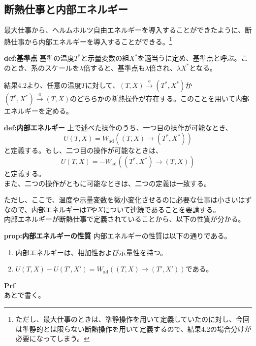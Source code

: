\documentclass[a4paper,11pt]{jsarticle}
\begin{document}
\subsection{断熱仕事と内部エネルギー}
最大仕事から、ヘルムホルツ自由エネルギーを導入することができたように、断熱仕事から内部エネルギーを導入することができる。\footnote{ただし、最大仕事のときは、準静操作を用いて定義していたのに対し、今回は準静的とは限らない断熱操作を用いて定義するので、結果4.2の場合分けが必要になってしまう。}\\
\begin{itembox}[l]{\textbf{def:基準点}}
    基準の温度$T^*$と示量変数の組$X^*$を適当うに定め、基準点と呼ぶ。このとき、系のスケールを$\lambda$倍すると、基準点も$\lambda$倍され、$\lambda X^*$となる。
\end{itembox}
結果4.2より、任意の温度$T$に対して、$(T,X)\xrightarrow{a} (T^*,X^*)$か$(T^*,X^*)\xrightarrow{a} (T,X)$のどちらかの断熱操作が存在する。このことを用いて内部エネルギーを定める。\\
\begin{itembox}[l]{\textbf{def:内部エネルギー}}
上で述べた操作のうち、一つ目の操作が可能なとき、
\begin{equation}
    U(T,X) = W_{\text{ad}}((T,X)\rightarrow (T^*,X^*))
\end{equation}
と定義する。もし、二つ目の操作が可能なときは、
\begin{equation}
    U(T,X) = -W_{\text{ad}}((T^*,X^*)\rightarrow (T,X))
\end{equation}
と定義する。\\
また、二つの操作がともに可能なときは、二つの定義は一致する。
\end{itembox}
ただし、ここで、温度や示量変数を微小変化させるのに必要な仕事は小さいはずなので、内部エネルギーは$T$や$X$について連続であることを要請する。\\
内部エネルギーが断熱仕事で定義されていることから、以下の性質が分かる。\\
\begin{itembox}[l]{\textbf{prop:内部エネルギーの性質}}
    内部エネルギーの性質は以下の通りである。
    \begin{enumerate}
        \item 内部エネルギーは、相加性および示量性を持つ。
        \item $U(T,X)-U(T',X') = W_{\text{ad}}((T,X)\rightarrow (T',X'))$である。
    \end{enumerate}
\end{itembox}
\textbf{Prf}\\
あとで書く。\\
\end{document}
